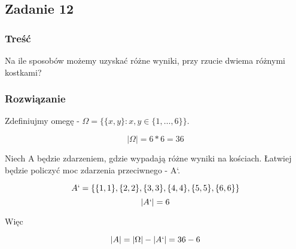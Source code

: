 \subsection{Zadanie 12}

\subsubsection*{Treść}
Na ile sposobów możemy uzyskać różne wyniki, przy rzucie dwiema różnymi kostkami? 


\subsubsection*{Rozwiązanie}
Zdefiniujmy omegę - $\Omega = \{\{x,y\} : x, y \in \{1, \dots , 6\}\}$.

$$|\Omega| = 6 * 6 = 36$$

Niech A będzie zdarzeniem, gdzie wypadają różne wyniki na kościach.
Łatwiej będzie policzyć moc zdarzenia przeciwnego - A`.

$$A` = \{\{1,1\}, \{2,2\}, \{3,3\}, \{4,4\}, \{5,5\}, \{6,6\}\}$$
$$|A`| = 6$$

Więc

$$|A| = |\Omega| - |A`| = 36 - 6$$

